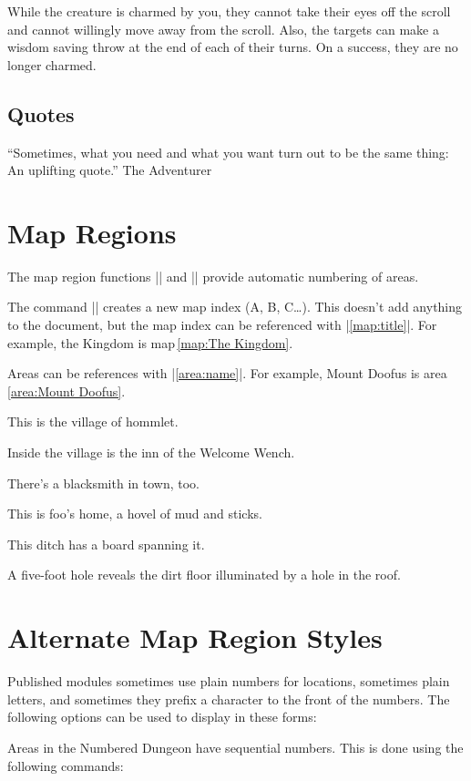 \documentclass[letterpaper,twocolumn,openany,nodeprecatedcode]{dndbook}
\begin{document}
While the creature is charmed by you, they cannot take their eyes off the scroll and cannot willingly move away from the scroll. Also, the targets can make a wisdom saving throw at the end of each of their turns. On a success, they are no longer charmed.

\subsection{Quotes}
\DndQuote%
  {``Sometimes, what you need and what you}
  {want turn out to be the same thing: An uplifting quote.''}
  {The Adventurer}

\section{Map Regions}
The map region functions |\DndArea| and |\DndSubArea| provide automatic numbering of areas.

The command || creates a new map index (A, B, C\ldots). This doesn't add anything to the document, but the map index can be referenced with |\ref{map:title}|. For example, the Kingdom is map\,\ref{map:The Kingdom}.


Areas can be references with |\ref{area:name}|. For example, Mount Doofus is area \ref{area:Mount Doofus}.

This is the village of hommlet.

Inside the village is the inn of the Welcome Wench.

There's a blacksmith in town, too.

This is foo's home, a hovel of mud and sticks.

This ditch has a board spanning it.

A five-foot hole reveals the dirt floor illuminated by a hole in the roof.

\section{Alternate Map Region Styles}
Published modules sometimes use plain numbers for locations, sometimes plain
letters, and sometimes they prefix a character to the front of the numbers.
The following options can be used to display in these forms:

Areas in the Numbered Dungeon have sequential numbers. This is done using
the following commands:
\end{document}
